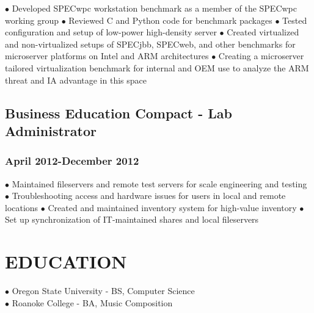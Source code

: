 \documentclass{article}
\begin{document}
$\bullet$ Developed SPECwpc workstation benchmark as a member of the SPECwpc working group
$\bullet$ Reviewed C and Python code for benchmark packages
$\bullet$ Tested configuration and setup of low-power high-density server
$\bullet$ Created virtualized and non-virtualized setups of SPECjbb, SPECweb, and other benchmarks for microserver platforms on Intel and ARM architectures
$\bullet$ Creating a microserver tailored virtualization benchmark for internal and OEM use to analyze the ARM threat and IA advantage in this space

\subsection*{Business Education Compact - Lab Administrator}
\subsubsection*{April 2012-December 2012}

$\bullet$ Maintained fileservers and remote test servers for scale engineering and testing
$\bullet$ Troubleshooting access and hardware issues for users in local and remote locations
$\bullet$ Created and maintained inventory system for high-value inventory
$\bullet$ Set up synchronization of IT-maintained shares and local fileservers

\section*{EDUCATION}

$\bullet$ Oregon State University - BS, Computer Science\\
$\bullet$ Roanoke College - BA, Music Composition\\
\end{document}
